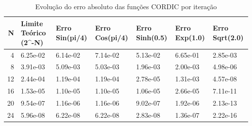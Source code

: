 \begin{table}
\caption{Evolução do erro absoluto das funções CORDIC por iteração}
\label{tab:convergencia}
\begin{tabular}{rllllll}
\toprule
N & Limite Teórico (2^-N) & Erro Sin(pi/4) & Erro Cos(pi/4) & Erro Sinh(0.5) & Erro Exp(1.0) & Erro Sqrt(2.0) \\
\midrule
4 & 6.25e-02 & 6.14e-02 & 7.14e-02 & 5.13e-02 & 6.65e-01 & 2.85e-03 \\
8 & 3.91e-03 & 5.09e-03 & 5.03e-03 & 1.96e-03 & 2.00e-03 & 4.98e-06 \\
12 & 2.44e-04 & 1.19e-04 & 1.19e-04 & 2.78e-05 & 1.31e-03 & 4.57e-08 \\
16 & 1.53e-05 & 1.10e-05 & 1.10e-05 & 1.06e-05 & 2.66e-05 & 7.11e-11 \\
20 & 9.54e-07 & 1.16e-06 & 1.16e-06 & 9.02e-07 & 1.92e-06 & 2.13e-13 \\
24 & 5.96e-08 & 6.22e-08 & 6.22e-08 & 2.83e-08 & 1.36e-07 & 2.22e-16 \\
\bottomrule
\end{tabular}
\end{table}
